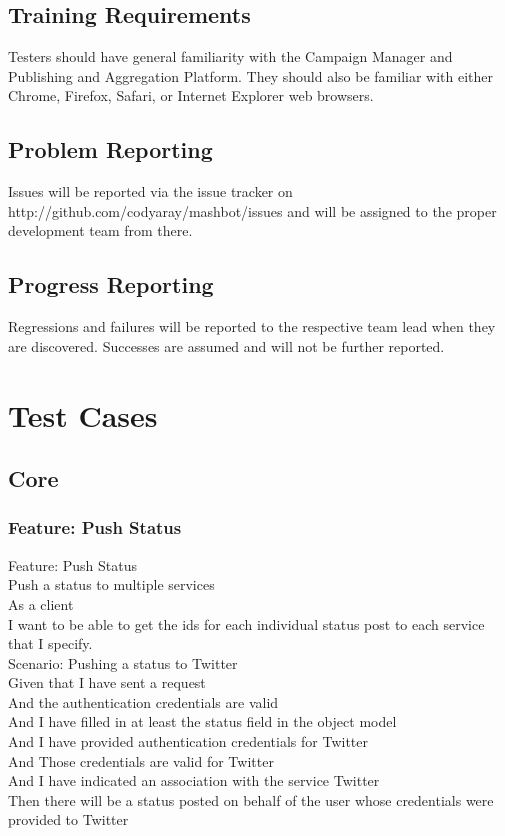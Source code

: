\documentclass[12pt]{article}
\begin{document}
\subsection{Training Requirements}
Testers should have general familiarity with the Campaign Manager and Publishing and Aggregation Platform. They should also be familiar with either Chrome, Firefox, Safari, or Internet Explorer web browsers.

\subsection{Problem Reporting}
Issues will be reported via the issue tracker on http://github.com/codyaray/mashbot/issues and will be assigned to the proper development team from there.
\subsection{Progress Reporting}
Regressions and failures will be reported to the respective team lead when they are discovered. Successes are assumed and will not be further reported.

\section{Test Cases}

\subsection{Core}

\subsubsection{Feature: Push Status}

Feature: Push Status \\
	Push a status to multiple services \\
	As a client \\
	I want to be able to get the ids for each individual status post to each  
	service that I specify. \\
	
Scenario: Pushing a status to Twitter \\
	Given that I have sent a request \\
	And the authentication credentials are valid \\
	And I have filled in at least the status field in the object model \\
	And I have provided authentication credentials for Twitter \\ 
	And Those credentials are valid for Twitter \\ 
	And I have indicated an association with the service Twitter \\
	Then there will be a status posted on behalf of the user whose credentials 
	were provided to Twitter
\end{document}
